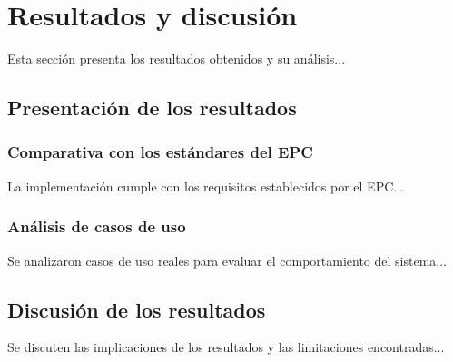 \section{Resultados y discusión}
\label{sec:ResultadosDiscusion}
Esta sección presenta los resultados obtenidos y su análisis...

\subsection{Presentación de los resultados}
\label{subsec:PresentacionResultados}
\subsubsection{Comparativa con los estándares del EPC}
\label{subsubsec:ComparativaEPC}
La implementación cumple con los requisitos establecidos por el EPC...

\subsubsection{Análisis de casos de uso}
\label{subsubsec:AnalisisCasosUso}
Se analizaron casos de uso reales para evaluar el comportamiento del sistema...

\subsection{Discusión de los resultados}
\label{subsec:DiscusionResultados}
Se discuten las implicaciones de los resultados y las limitaciones encontradas...
